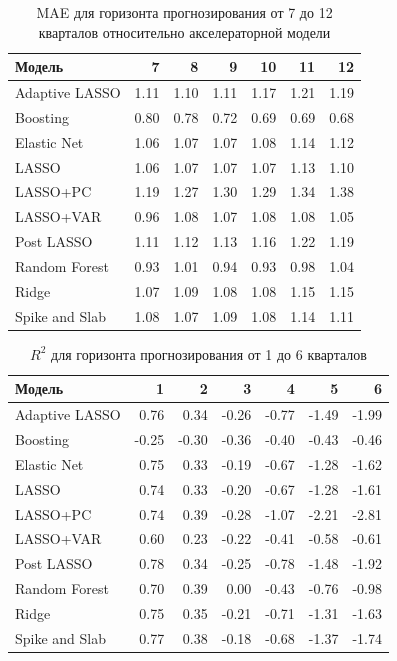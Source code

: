 \begin{appendices}
\begin{table}[ht]
\centering
\caption{MAE для горизонта прогнозирования от 7 до 12 кварталов относительно акселераторной модели}
\begin{tabular}{lrrrrrr}
  \hline
Модель & 7 & 8 & 9 & 10 & 11 & 12 \\ 
  \hline
Adaptive LASSO & 1.11 & 1.10 & 1.11 & 1.17 & 1.21 & 1.19 \\ 
  Boosting & 0.80 & 0.78 & 0.72 & 0.69 & 0.69 & 0.68 \\ 
  Elastic Net & 1.06 & 1.07 & 1.07 & 1.08 & 1.14 & 1.12 \\ 
  LASSO & 1.06 & 1.07 & 1.07 & 1.07 & 1.13 & 1.10 \\ 
  LASSO+PC & 1.19 & 1.27 & 1.30 & 1.29 & 1.34 & 1.38 \\ 
  LASSO+VAR & 0.96 & 1.08 & 1.07 & 1.08 & 1.08 & 1.05 \\ 
  Post LASSO & 1.11 & 1.12 & 1.13 & 1.16 & 1.22 & 1.19 \\ 
  Random Forest & 0.93 & 1.01 & 0.94 & 0.93 & 0.98 & 1.04 \\ 
  Ridge & 1.07 & 1.09 & 1.08 & 1.08 & 1.15 & 1.15 \\ 
  Spike and Slab & 1.08 & 1.07 & 1.09 & 1.08 & 1.14 & 1.11 \\ 
   \hline
\end{tabular}
\end{table}


\begin{table}[ht]
\centering
\caption{$R^2$ для горизонта прогнозирования от 1 до 6 кварталов}
\begin{tabular}{lrrrrrr}
  \hline
Модель & 1 & 2 & 3 & 4 & 5 & 6 \\ 
  \hline
Adaptive LASSO & 0.76 & 0.34 & -0.26 & -0.77 & -1.49 & -1.99 \\ 
  Boosting & -0.25 & -0.30 & -0.36 & -0.40 & -0.43 & -0.46 \\ 
  Elastic Net & 0.75 & 0.33 & -0.19 & -0.67 & -1.28 & -1.62 \\ 
  LASSO & 0.74 & 0.33 & -0.20 & -0.67 & -1.28 & -1.61 \\ 
  LASSO+PC & 0.74 & 0.39 & -0.28 & -1.07 & -2.21 & -2.81 \\ 
  LASSO+VAR & 0.60 & 0.23 & -0.22 & -0.41 & -0.58 & -0.61 \\ 
  Post LASSO & 0.78 & 0.34 & -0.25 & -0.78 & -1.48 & -1.92 \\ 
  Random Forest & 0.70 & 0.39 & 0.00 & -0.43 & -0.76 & -0.98 \\ 
  Ridge & 0.75 & 0.35 & -0.21 & -0.71 & -1.31 & -1.63 \\ 
  Spike and Slab & 0.77 & 0.38 & -0.18 & -0.68 & -1.37 & -1.74 \\ 
   \hline
\end{tabular}
\end{table}


\end{appendices}
